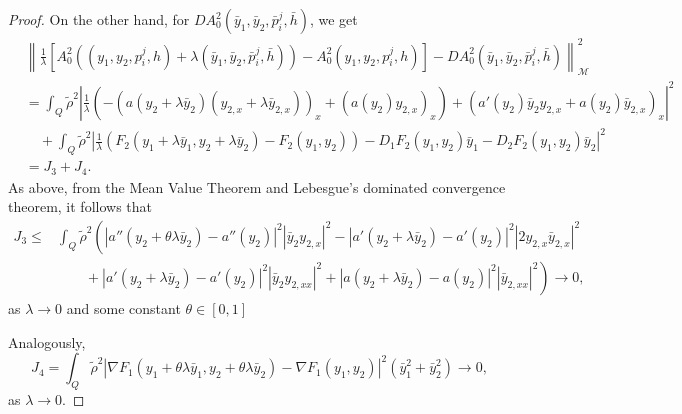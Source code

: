 \documentclass[10pt,a4paper]{amsart}
\begin{document}
\begin{proof}
\noindent On the other hand, for $D A^2_0(\bar y_1,\bar y_2,\bar p_i^j,\bar h)$, we get
    \begin{equation*}		
    	\begin{split}
    		&\left\| \frac{1}{\lambda}\left[ A^2_0 (( y_1, y_2, p_i^j, h)+\lambda(\bar y_1,\bar y_2,\bar p_i^j,\bar h)) - A^2_0( y_1, y_2, p_i^j, h) \right] - D A^2_0(\bar y_1,\bar y_2,\bar p_i^j,\bar h) \right\|^{2}_{\mathcal{M}} \\
    		& = \int_Q \tilde\rho^2 \left| \frac{1}{\lambda}\left( - \left( a(y_2 + \lambda \bar y_2) (y_{2,x}+\lambda \bar y_{2,x}) \right)_x + \left( a(y_2)y_{2,x} \right)_x \right) + (a'(y_{2})\bar y_{2} y_{2,x} +a(y_2) \bar y_{2,x})_x \right|^2 \\ 
            &\quad + \int_Q \tilde\rho^2 \left| \frac{1}{\lambda}(F_2(y_1+\lambda\bar y_1,y_2+\lambda\bar y_2)-F_2(y_1,y_2)) - D_1 F_2(y_1,y_2)\bar y_1 - D_2 F_2(y_1,y_2)\bar y_2 \right|^2 \\
            & = J_3+J_4.
    	\end{split}
    \end{equation*}As above, from the Mean Value Theorem and Lebesgue's dominated convergence theorem, it follows that
    \begin{equation*}
        \begin{split}
            J_3 \leq &\int_Q \tilde\rho^2 \left( \left| a''(y_2 + \theta \lambda \bar y_2) - a''(y_2) \right|^2 |\bar y_2 y_{2,x} |^2 - \left| a'(y_2 + \lambda \bar y_2)-a'(y_2) \right|^2 \left| 2 y_{2,x} \bar y_{2,x} \right|^2 \right.\\
            &\left. \qquad + \left| a'(y_2 + \lambda\bar y_2) - a'(y_2) \right|^2 |\bar y_2 y_{2,xx}|^2 + |a(y_2+\lambda\bar y_2)-a(y_2)|^2 |\bar y_{2,xx}|^2 \right) \to 0,
        \end{split}
    \end{equation*} as $\lambda \to 0$ and some  constant $\theta \in [0,1]$ 
    
   \noindent Analogously, %
    $$
        J_4 = \int_Q \tilde\rho^2 \left| \nabla F_1(y_1+\theta\lambda\bar y_1,y_2+\theta\lambda\bar y_2) - \nabla F_1(y_1,y_2) \right|^2 (\bar y_1^2 + \bar y_2^2 ) \to 0,
    $$ as $\lambda \to 0$.
    

\end{proof}
\end{document}
